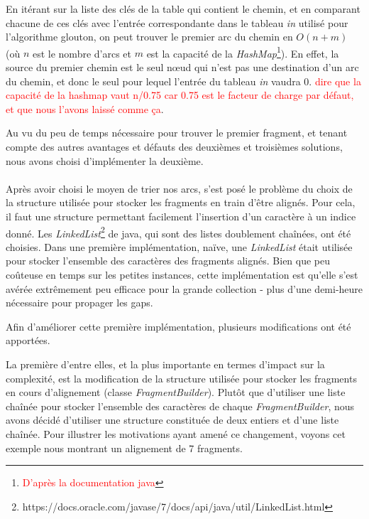 \documentclass{article}
\begin{document}
En itérant sur la liste des clés de la table qui contient le chemin, et en comparant chacune de ces clés avec l'entrée correspondante dans le tableau \textit{in} utilisé pour l'algorithme glouton, on peut trouver le premier arc du chemin en $O(n+m)$ (où $n$ est le nombre d'arcs et $m$ est la capacité de la \textit{HashMap}\footnote{\textcolor{red}{D'après la documentation java}}). En effet, la source du premier chemin est le seul nœud qui n'est pas une destination d'un arc du chemin, et donc le seul pour lequel l'entrée du tableau \textit{in} vaudra $0$. \textcolor{red}{dire que la capacité de la hashmap vaut n/0.75 car 0.75 est le facteur de charge par défaut, et que nous l'avons laissé comme ça}.

Au vu du peu de temps nécessaire pour trouver le premier fragment, et tenant compte des autres avantages et défauts des deuxièmes et troisièmes solutions, nous avons choisi d'implémenter la deuxième.
\\~\\ 
 
Après avoir choisi le moyen de trier nos arcs, s'est posé le problème du choix de la structure utilisée pour stocker les fragments en train d'être alignés. Pour cela, il faut une structure permettant facilement l'insertion d'un caractère à un indice donné. Les \textit{LinkedList}\footnote{https://docs.oracle.com/javase/7/docs/api/java/util/LinkedList.html} de java, qui sont des listes doublement chaînées, ont été choisies. Dans une première implémentation, naïve, une \textit{LinkedList} était utilisée pour stocker l'ensemble des caractères des fragments alignés. 
Bien que peu coûteuse en temps sur les petites instances, cette implémentation est qu'elle s'est avérée extrêmement peu efficace pour la grande collection - plus d'une demi-heure nécessaire pour propager les gaps. 

Afin d'améliorer cette première implémentation, plusieurs modifications ont été apportées.

La première d'entre elles, et la plus importante en termes d'impact sur la complexité, est la modification de la structure utilisée pour stocker les fragments en cours d'alignement (classe \textit{FragmentBuilder}). Plutôt que d'utiliser une liste chaînée pour stocker l'ensemble des caractères de chaque \textit{FragmentBuilder}, nous avons décidé d'utiliser une structure constituée de deux entiers et d'une liste chaînée. Pour illustrer les motivations ayant amené ce changement, voyons cet exemple nous montrant un alignement de 7 fragments.
\end{document}
